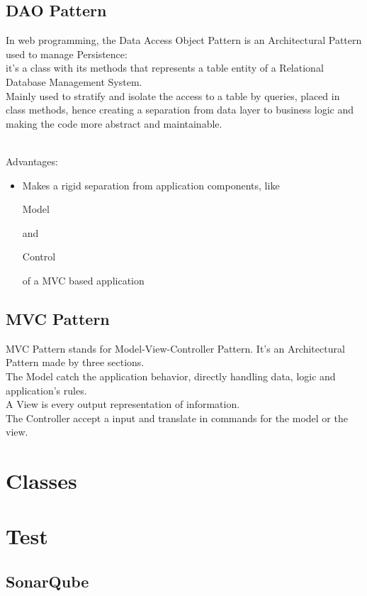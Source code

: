 \documentclass[12pt]{article}
\begin{document}
\subsection{DAO Pattern}
In web programming, the Data Access Object Pattern is an Architectural Pattern used to manage Persistence:\\
it's a class with its methods that represents a table entity of a Relational Database Management System.\\
Mainly used to stratify and isolate the access to a table by queries, placed in class methods, hence creating a separation from data layer to business logic and making the code more abstract and maintainable.\\
\\
\begin{itshape}
Advantages:
\end{itshape}
\begin{itemize}
\item Makes a rigid separation from application components, like 
\begin{itshape} 
Model 
\end{itshape} and 
\begin{itshape}
Control
\end{itshape} of a MVC based application
\end{itemize}
\subsection{MVC Pattern}
MVC Pattern stands for Model-View-Controller Pattern. It's an Architectural Pattern made by three sections.\\
The Model catch the application behavior, directly handling data, logic and application's rules.\\
A View is every output representation of information.\\
The Controller accept a input and translate in commands for the model or the view.\\
\section{Classes}
\section{Test}
\subsection{SonarQube}
\end{document}
